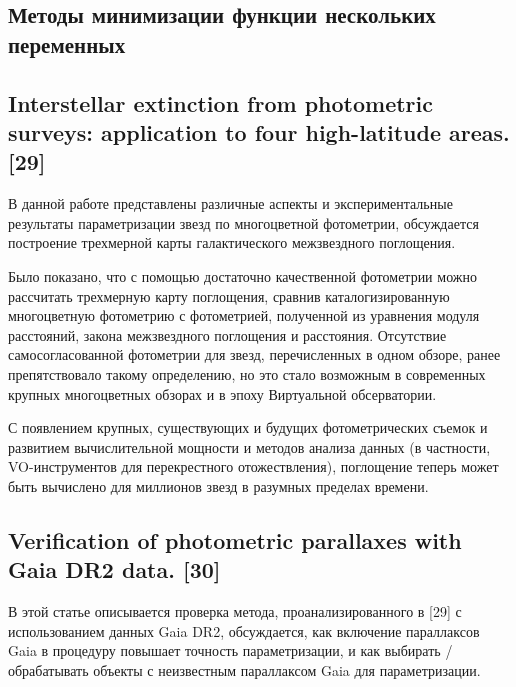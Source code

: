 \documentclass[12pt, a4paper]{article}
\begin{document}
	\subsection*{Методы минимизации функции нескольких переменных}

	\subsection*{Interstellar extinction from photometric surveys: application to four high-latitude areas. [29]}
	В данной работе представлены различные аспекты и экспериментальные результаты параметризации звезд по многоцветной фотометрии, обсуждается построение трехмерной карты галактического межзвездного поглощения.

	Было показано, что с помощью достаточно качественной фотометрии можно рассчитать трехмерную карту поглощения, сравнив каталогизированную многоцветную фотометрию с фотометрией, полученной из уравнения модуля расстояний, закона межзвездного поглощения и расстояния. Отсутствие самосогласованной фотометрии для звезд, перечисленных в одном обзоре, ранее препятствовало такому определению, но это стало возможным в современных крупных многоцветных обзорах и в эпоху Виртуальной обсерватории.

	С появлением крупных, существующих и будущих фотометрических съемок и развитием вычислительной мощности и методов анализа данных (в частности, VO-инструментов для перекрестного отожествления), поглощение теперь может быть вычислено для миллионов звезд в разумных пределах времени.

	\subsection*{Verification of photometric parallaxes with Gaia DR2 data. [30]}
	В этой статье описывается проверка метода, проанализированного в [29] с использованием данных Gaia DR2, обсуждается, как включение параллаксов Gaia в процедуру повышает точность параметризации, и как выбирать / обрабатывать объекты с неизвестным параллаксом Gaia для параметризации.
\end{document}
